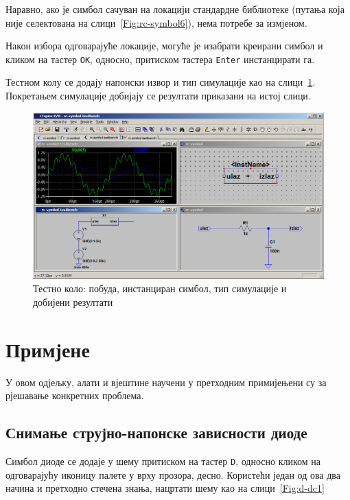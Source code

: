 Наравно, ако је симбол сачуван на локацији стандардне библиотеке (путања која није селектована на слици~\ref{Fig:rc-symbol6}), нема потребе за измјеном.

Након избора одговарајуће локације, могуће је изабрати креирани симбол и кликом на тастер \texttt{OK}, односно, притиском тастера \texttt{Enter} инстанцирати га.

Тестном колу се додају напонски извор и тип симулације као на слици~\ref{Fig:rc-symbol7}. Покретањем симулације добијају се резултати приказани на истој слици.

\begin{figure}[h]
\centering
\includegraphics[width=\figwidth\textwidth]{figs/rc-symbol7.PNG}
\caption{Тестно коло: побуда, инстанциран симбол, тип симулације и добијени резултати}
\label{Fig:rc-symbol7}
\end{figure}

\chapter{Примјене}

У овом одјељку, алати и вјештине научени у претходним примијењени су за рјешавање конкретних проблема.

\section{Снимање струјно-напонске зависности диоде}

Симбол диоде се додаје у шему притиском на тастер \texttt{D}, односно кликом на одговарајућу иконицу палете у врху прозора, десно. Користећи један од ова два начина и претходно стечена знања, нацртати шему као на слици~\ref{Fig:d-dc1}

